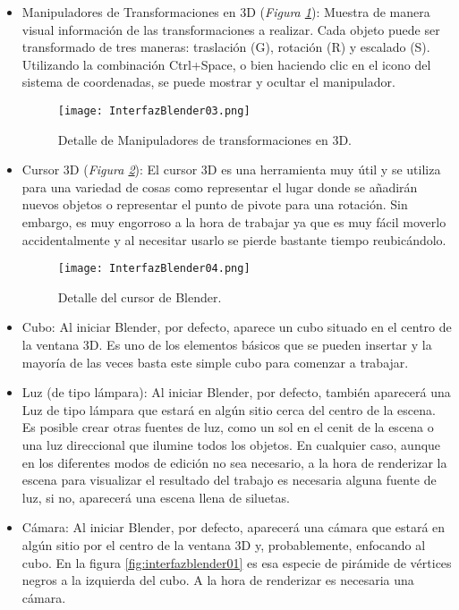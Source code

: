 \begin{itemize}
	\item Manipuladores de Transformaciones en 3D (\textit{Figura \ref{fig:interfazblender03}}): Muestra de manera visual información de las transformaciones a realizar. Cada objeto puede ser transformado de tres maneras: traslación (G), rotación (R) y escalado (S). Utilizando la combinación Ctrl+Space,	o bien haciendo clic en el icono del sistema de coordenadas, se puede mostrar y ocultar el manipulador. 
	\begin{figure}[h]
		\centering
		\texttt{[image: InterfazBlender03.png]}
		\caption{Detalle de Manipuladores de transformaciones en 3D.} \label{fig:interfazblender03}
	\end{figure}
	
	
	\item Cursor 3D (\textit{Figura \ref{fig:interfazblender04}}): El cursor 3D es una herramienta muy útil y se utiliza para una variedad de cosas como representar el lugar donde se añadirán nuevos objetos o representar el punto de pivote para una rotación. Sin embargo, es muy engorroso a la hora de trabajar ya que es muy fácil moverlo accidentalmente y al necesitar usarlo se pierde bastante tiempo reubicándolo.
	\begin{figure}[h]
		\centering
		\texttt{[image: InterfazBlender04.png]}
		\caption{Detalle del cursor de Blender.} \label{fig:interfazblender04}
	\end{figure}

	\item Cubo: Al iniciar Blender, por defecto, aparece un cubo situado en el centro de la ventana 3D. Es uno de los elementos básicos que se pueden insertar y la mayoría de las veces basta este simple cubo para comenzar a trabajar.
	
	\item Luz (de tipo lámpara): Al iniciar Blender, por defecto, también aparecerá una Luz de tipo lámpara que estará en algún sitio cerca del centro de la escena. Es posible crear otras fuentes de luz, como un sol en el cenit de la escena o una luz direccional que ilumine todos los objetos. En cualquier caso, aunque en los diferentes modos de edición no sea necesario, a la hora de renderizar la escena para visualizar el resultado del trabajo es necesaria alguna fuente de luz, si no, aparecerá una escena llena de siluetas.
	
	\item Cámara: Al iniciar Blender, por defecto, aparecerá una cámara que estará en algún sitio por el centro de la ventana 3D y, probablemente, enfocando al cubo. En la figura \ref{fig:interfazblender01} es esa especie de pirámide de vértices negros a la izquierda del cubo. A la hora de renderizar es necesaria una cámara.
	

\end{itemize}
